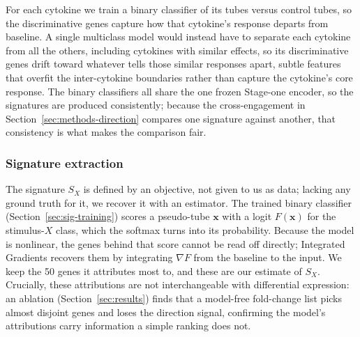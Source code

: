 \documentclass[11pt,a4paper]{article}
\begin{document}
For each cytokine we train a binary classifier of its tubes versus control tubes, so the discriminative genes capture how that cytokine's response departs from baseline. A single multiclass model would instead have to separate each cytokine from all the others, including cytokines with similar effects, so its discriminative genes drift toward whatever tells those similar responses apart, subtle features that overfit the inter-cytokine boundaries rather than capture the cytokine's core response. The binary classifiers all share the one frozen Stage-one encoder, so the signatures are produced consistently; because the cross-engagement in Section~\ref{sec:methods-direction} compares one signature against another, that consistency is what makes the comparison fair.

\subsubsection{Signature extraction}
\label{sec:sig-extraction}
The signature $S_X$ is defined by an objective, not given to us as data; lacking any ground truth for it, we recover it with an estimator. The trained binary classifier (Section~\ref{sec:sig-training}) scores a pseudo-tube $\mathbf{x}$ with a logit $F(\mathbf{x})$ for the stimulus-$X$ class, which the softmax turns into its probability. Because the model is nonlinear, the genes behind that score cannot be read off directly; Integrated Gradients \citep{sundararajan2017axiomatic} recovers them by integrating $\nabla F$ from the baseline to the input. We keep the 50 genes it attributes most to, and these are our estimate of $S_X$. Crucially, these attributions are not interchangeable with differential expression: an ablation (Section~\ref{sec:results}) finds that a model-free fold-change list picks almost disjoint genes and loses the direction signal, confirming the model's attributions carry information a simple ranking does not.
\end{document}
